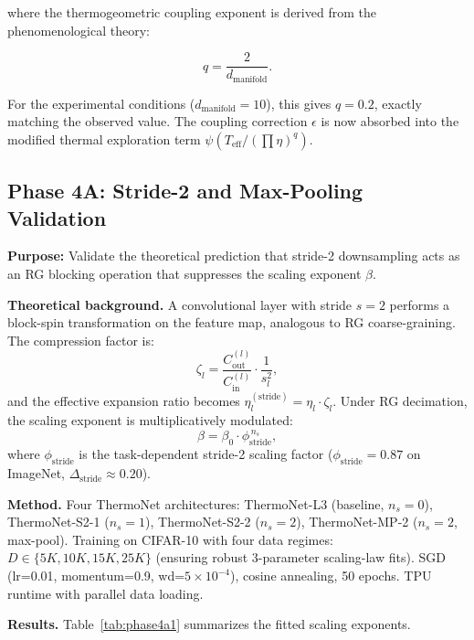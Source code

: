 \documentclass[11pt, a4paper]{article}
\theoremstyle{definition}
\begin{document}
where the thermogeometric coupling exponent is derived from the phenomenological theory:

\begin{equation}
q = \frac{2}{d_{\text{manifold}}}.
\label{eq:q_explicit}
\end{equation}

For the experimental conditions ($d_{\text{manifold}} = 10$), this gives $q = 0.2$, exactly matching the observed value. The coupling correction $\epsilon$ is now absorbed into the modified thermal exploration term $\psi(T_{\text{eff}} / (\prod\eta)^q)$.

\subsection{Phase 4A: Stride-2 and Max-Pooling Validation}
\label{sec:phase-4a}

\textbf{Purpose:} Validate the theoretical prediction that stride-2 downsampling acts as an RG blocking operation that suppresses the scaling exponent $\beta$.

\textbf{Theoretical background.} A convolutional layer with stride $s=2$ performs a block-spin transformation on the feature map, analogous to RG coarse-graining. The compression factor is:
\begin{equation}
\zeta_l = \frac{C_{\mathrm{out}}^{(l)}}{C_{\mathrm{in}}^{(l)}} \cdot \frac{1}{s_l^2},
\end{equation}
and the effective expansion ratio becomes $\eta_l^{(\mathrm{stride})} = \eta_l \cdot \zeta_l$. Under RG decimation, the scaling exponent is multiplicatively modulated:
\begin{equation}
\beta = \beta_0 \cdot \phi_{\mathrm{stride}}^{\,n_s},
\end{equation}
where $\phi_{\mathrm{stride}}$ is the task-dependent stride-2 scaling factor ($\phi_{\mathrm{stride}} = 0.87$ on ImageNet, $\Delta_{\mathrm{stride}} \approx 0.20$).

\textbf{Method.} Four ThermoNet architectures: ThermoNet-L3 (baseline, $n_s=0$), ThermoNet-S2-1 ($n_s=1$), ThermoNet-S2-2 ($n_s=2$), ThermoNet-MP-2 ($n_s=2$, max-pool). Training on CIFAR-10 with four data regimes: $D \in \{5K, 10K, 15K, 25K\}$ (ensuring robust 3-parameter scaling-law fits). SGD (lr=0.01, momentum=0.9, wd=$5\times10^{-4}$), cosine annealing, 50 epochs. TPU runtime with parallel data loading.

\textbf{Results.} Table~\ref{tab:phase4a1} summarizes the fitted scaling exponents.
\end{document}
